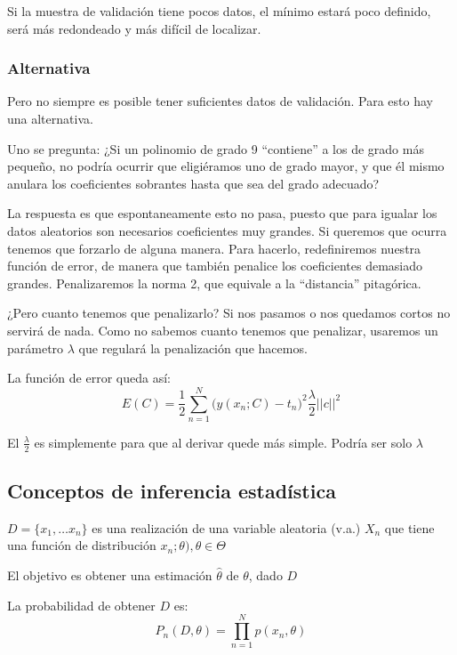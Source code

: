 \documentclass[a4paper,10pt]{article}
\begin{document}
Si la muestra de validación tiene pocos datos, el mínimo estará poco definido, será más redondeado y más difícil de localizar.

\subsubsection*{Alternativa}
Pero no siempre es posible tener suficientes datos de validación. Para esto hay una alternativa.

Uno se pregunta: ¿Si un polinomio de grado 9 ``contiene'' a los de grado más pequeño, no podría ocurrir que eligiéramos uno de grado mayor, y que él mismo anulara los coeficientes sobrantes hasta que sea del grado adecuado?

La respuesta es que espontaneamente esto no pasa, puesto que para igualar los datos aleatorios son necesarios coeficientes muy grandes. Si queremos que ocurra tenemos que forzarlo de alguna manera. Para hacerlo, redefiniremos nuestra función de error, de manera que también penalice los coeficientes demasiado grandes. Penalizaremos la norma 2, que equivale a la ``distancia'' pitagórica.

¿Pero cuanto tenemos que penalizarlo? Si nos pasamos o nos quedamos cortos no servirá de nada. Como no sabemos cuanto tenemos que penalizar, usaremos un parámetro $\lambda$ que regulará la penalización que hacemos.

La función de error queda así:
\begin{equation*}
E(C) = \frac{1}{2} \sum_{n = 1}^{N} \Big( y(x_n;C) - t_n\Big)^2 \frac{\lambda}{2}||c||^2
\end{equation*}

El $\frac{\lambda}{2}$ es simplemente para que al derivar quede más simple. Podría ser solo $\lambda$

\subsection{Conceptos de inferencia estadística}

$D = \{x_1, \dots x_n\}$ es una realización de una variable aleatoria (v.a.) $X_n$ que tiene una función de distribución $x_n;\theta), \theta \in \Theta$

El objetivo es obtener una estimación $\hat{\theta}$ de $\theta$, dado $D$

La probabilidad de obtener $D$ es:
\begin{equation*}
P_n(D,\theta) = \prod_{n = 1}^{N} p(x_n,\theta)
\end{equation*}
\end{document}
